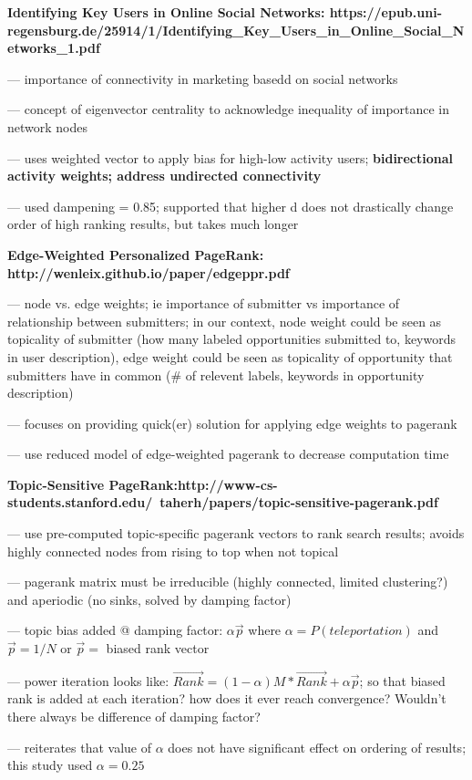 \documentclass[]{report}   %
\begin{document}
\textbf{Identifying Key Users in Online Social Networks: https://epub.uni-regensburg.de/25914/1/Identifying\_Key\_Users\_in\_Online\_Social\_Networks\_1.pdf}

--- importance of connectivity in marketing basedd on social networks

--- concept of eigenvector centrality to acknowledge inequality of importance in network nodes

--- uses weighted vector to apply bias for high-low activity users; \textbf{ bidirectional activity weights; address undirected connectivity}

--- used dampening = 0.85; supported that higher d does not drastically change order of high ranking results, but takes much longer

\textbf{Edge-Weighted Personalized PageRank: http://wenleix.github.io/paper/edgeppr.pdf}

--- node vs. edge weights; ie importance of submitter vs importance of relationship between submitters; in our context, node weight could be seen as topicality of submitter (how many labeled opportunities submitted to, keywords in user description), edge weight could be seen as topicality of opportunity that submitters have in common (\# of relevent labels, keywords in opportunity description)

--- focuses on providing quick(er) solution for applying edge weights to pagerank

--- use reduced model of edge-weighted pagerank to decrease computation time

\textbf{Topic-Sensitive PageRank:http://www-cs-students.stanford.edu/~taherh/papers/topic-sensitive-pagerank.pdf}

--- use pre-computed topic-specific pagerank vectors to rank search results; avoids highly connected nodes from rising to top when not topical

--- pagerank matrix must be irreducible (highly connected, limited clustering?) and aperiodic (no sinks, solved by damping factor)

--- topic bias added @ damping factor: $\alpha \vec{p}$ where $\alpha = P(teleportation)$ and $\vec{p} = 1/N$ or $\vec{p} =$ biased rank vector

--- power iteration looks like: $\vec{Rank} = (1- \alpha )M * \vec{Rank} + \alpha \vec{p}$; so that biased rank is added at each iteration? how does it ever reach convergence? Wouldn't there always be difference of damping factor?

--- reiterates that value of $\alpha$ does not have significant effect on ordering of results; this study used $\alpha = 0.25$
\end{document}
